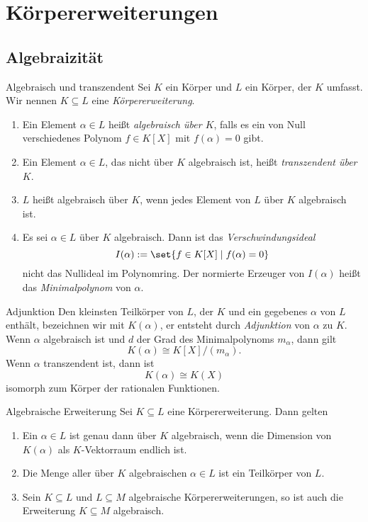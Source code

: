 \section{Körpererweiterungen}

\subsection{Algebraizität}

\begin{karte}{Algebraisch und transzendent}
    Sei \(K\) ein Körper und \(L\) ein Körper, der \(K\) umfasst. 
    Wir nennen \(K \subseteq L\) eine \textit{Körpererweiterung}.
    \begin{enumerate}
        \item Ein Element \(\alpha \in L\) heißt \textit{algebraisch über \(K\)}, 
        falls es ein von Null verschiedenes Polynom \(f \in K[X]\) mit \(f(\alpha) = 0\) gibt.
        \item Ein Element \(\alpha \in L\), das nicht über \(K\) algebraisch 
        ist, heißt \textit{transzendent über \(K\)}.
        \item \(L\) heißt algebraisch über \(K\), wenn jedes Element von \(L\) 
        über \(K\) algebraisch ist. 
        \item Es sei \(\alpha \in L\) über \(K\) algebraisch. Dann ist das 
        \textit{Verschwindungsideal} 
        \[ I(\alpha) := \set{f\in K[X] \;|\; f(\alpha) = 0} \]
        nicht das Nullideal im Polynomring. Der normierte Erzeuger 
        von \(I(\alpha)\) heißt das \textit{Minimalpolynom} von \(\alpha\).
    \end{enumerate}
\end{karte}

\begin{karte}{Adjunktion}
    Den kleinsten Teilkörper von \(L\), der \(K\) und 
    ein gegebenes \(\alpha\) von \(L\) enthält, bezeichnen wir mit 
    \(K(\alpha)\), er entsteht durch \textit{Adjunktion} von \(\alpha\) 
    zu \(K\).\\
    Wenn \(\alpha\) algebraisch ist und \(d\) der Grad des Minimalpolynoms 
    \(m_\alpha\), dann gilt 
    \[ K(\alpha) \cong K[X]/(m_\alpha). \]
    Wenn \(\alpha\) transzendent ist, dann ist 
    \[ K(\alpha) \cong K(X) \]
    isomorph zum Körper der rationalen Funktionen.
\end{karte}

\begin{karte}{Algebraische Erweiterung}
    Sei \(K \subseteq L\) eine Körpererweiterung. Dann gelten 
    \begin{enumerate}
        \item Ein \(\alpha \in L\) ist genau dann über \(K\) algebraisch, 
        wenn die Dimension von \(K(\alpha)\) als \(K\)-Vektorraum endlich ist.
        \item Die Menge aller über \(K\) algebraischen \(\alpha \in L\) ist 
        ein Teilkörper von \(L\).
        \item Sein \(K \subseteq L\) und \(L \subseteq M\) algebraische 
        Körpererweiterungen, so ist auch die Erweiterung \(K \subseteq M\) algebraisch.
    \end{enumerate}
\end{karte}

